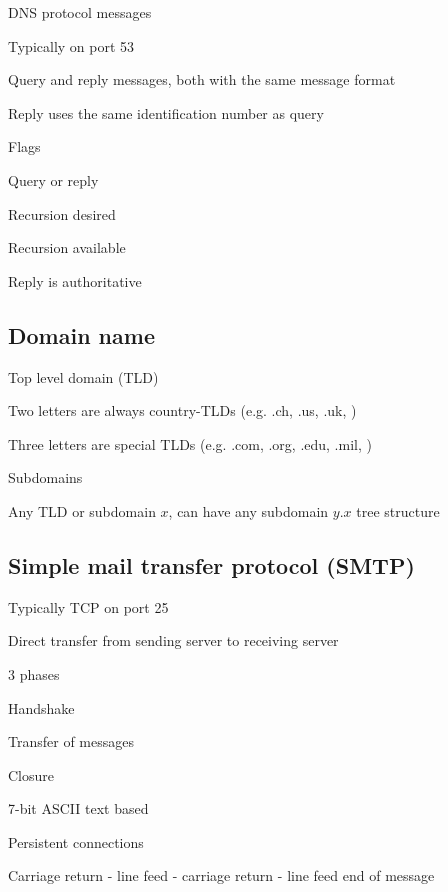 		\enumend
	\enumend
	\item DNS protocol messages
	\enumstart
		\item Typically on port 53
		\item Query and reply messages, both with the same message format
		\item Reply uses the same identification number as query
		\\ 
		\item Flags
		\enumstart
			\item Query or reply
			\item Recursion desired
			\item Recursion available
			\item Reply is authoritative
		\enumend
	\enumend
\enumend

\subsection{Domain name}
\enumstart
	\item Top level domain (TLD)
	\enumstart
		\item Two letters are always country-TLDs (e.g. .ch, .us, .uk, \ddd)
		\item Three letters are special TLDs (e.g. .com, .org, .edu, .mil, \ddd)
	\enumend
	\item Subdomains
	\enumstart
		\item Any TLD or subdomain $x$, can have any subdomain $y.x$ \arrow tree structure
	\enumend
\enumend

\subsection{Simple mail transfer protocol (SMTP)}
\enumstart
	\item Typically TCP on port 25
	\item Direct transfer from sending server to receiving server
	\item 3 phases
	\enumstart
		\item Handshake
		\item Transfer of messages
		\item Closure
	\enumend
	\item 7-bit ASCII text based
	\item Persistent connections
	\item Carriage return - line feed - carriage return - line feed \arrow end of message
\enumend
